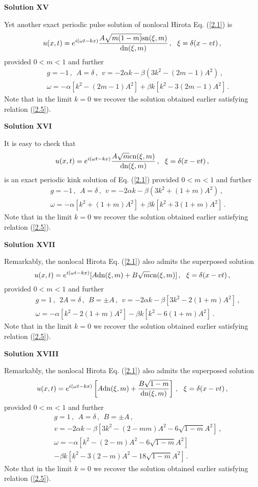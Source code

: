 \documentclass[11pt]{article}
\newcommand{\be}{\begin{equation}}
\newcommand{\ee}{\end{equation}}
\newcommand{\bea}{\begin{eqnarray}}
\newcommand{\eea}{\end{eqnarray}}
\newcommand{\sn}{{\rm sn}}
\newcommand{\dn}{{\rm dn}}
\newcommand{\cn}{{\rm cn}}
\begin{document}
{\bf Solution XV}

Yet another exact periodic pulse solution of nonlocal Hirota Eq.
(\ref{2.1}) is 
\be\label{8.14}
u(x,t) =  e^{i(\omega t - kx)} \frac{A\sqrt{m(1-m)} \sn(\xi,m)}
{\dn(\xi,m)}\,,~~\xi = \delta(x-vt)\,,
\ee
provided $0 < m < 1$ and further
\bea\label{8.15}
&&g = -1\,,~~A = \delta\,,~~v = -2\alpha k -\beta(3k^2-(2m-1)A^2)\,,
\nonumber \\
&&\omega = -\alpha[k^2-(2m-1)A^2]+ \beta k[k^2-3(2m-1)A^2]\,.
\eea
Note that in the limit $k = 0$ we recover the solution obtained 
earlier \cite{ks2} satisfying relation (\ref{2.5}). 

{\bf Solution XVI}

It is easy to check that 
\be\label{8.16}
u(x,t) = e^{i(\omega t - kx)} \frac{A\sqrt{m}\cn(\xi,m)}{\dn(\xi,m)}\,,
~~\xi = \delta(x-vt)\,,
\ee
is an exact periodic kink solution of Eq. (\ref{2.1}) provided
$0 < m < 1$ and further
\bea\label{8.17}
&&g = -1\,,~~A = \delta\,,~~v = -2\alpha k -\beta(3k^2+(1+m)A^2)\,,
\nonumber \\
&&\omega = -\alpha[k^2+(1+m)A^2] +\beta k [k^2+3(1+m)A^2]\,. 
\eea
Note that in the limit $k = 0$ we recover the solution obtained 
earlier \cite{ks2} satisfying relation (\ref{2.5}). 

{\bf Solution XVII}

Remarkably, the nonlocal Hirota Eq. (\ref{2.1}) also admits the
superposed solution
\be\label{8.18}
u(x,t) = e^{i(\omega t - kx)} [A \dn(\xi,m)+ B\sqrt{m}\cn(\xi,m)]\,,
~~\xi = \delta(x-vt)\,,
\ee
provided $0 < m < 1$ and further
\bea\label{8.19}
&&g = 1\,,~~2A = \delta\,,~~B = \pm A\,,~~v = -2\alpha k 
-\beta[3k^2-2(1+m)A^2]\,, \nonumber \\
&&\omega = -\alpha[k^2-2(1+m)A^2] -\beta k [k^2-6(1+m)A^2]\,.
\eea
Note that in the limit $k = 0$ we recover the solution obtained 
earlier \cite{ks2} satisfying relation (\ref{2.5}). 

{\bf Solution XVIII}

Remarkably, the nonlocal Hirota Eq. (\ref{2.1}) also admits the
superposed solution
\be\label{8.20}
u(x,t) = e^{i(\omega t - kx)} \left[A \dn(\xi,m)+ \frac{B\sqrt{1-m}}{\dn(\xi,m)}\right]\,,
~~\xi = \delta(x-vt)\,,
\ee
provided $0 < m < 1$ and further
\bea\label{8.21}
&&g = 1\,,~~A = \delta\,,~~B = \pm A\,, \nonumber \\
&&v = -2\alpha k -\beta[3k^2-(2-mm)A^2-6\sqrt{1-m}A^2]\,, \nonumber \\
&&\omega = -\alpha[k^2-(2-m)A^2 -6\sqrt{1-m} A^2]  \nonumber \\
&&-\beta k[k^2 -3(2-m)A^2 -18\sqrt{1-m}A^2]\,.
\eea
Note that in the limit $k = 0$ we recover the solution obtained 
earlier \cite{ks2} satisfying relation (\ref{2.5}). 
\end{document}
